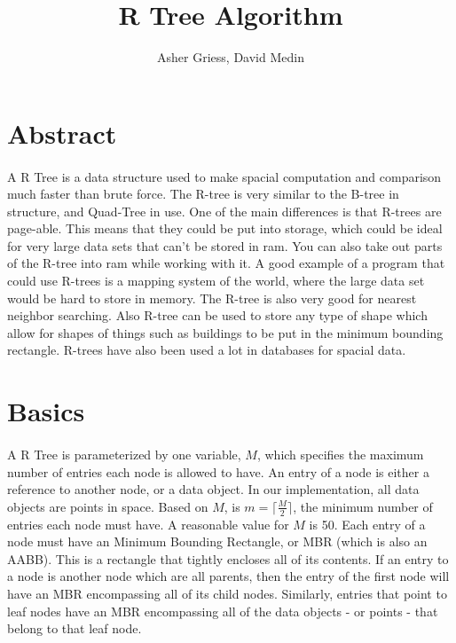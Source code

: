 \documentclass{article}
\author{Asher Griess, David Medin}
\title{R Tree Algorithm}
\begin{document}
\maketitle


\begin{multicols}{2}[]
\section{Abstract}
\paragraph{}
A R Tree is a data structure used to make spacial computation and comparison much faster than brute force.
The R-tree is very similar to the B-tree in structure, and Quad-Tree in use. One of the main differences is that
R-trees are page-able. This means that they could be put into storage, which could be ideal for very large data sets 
that can't be stored in ram.  You can also take out parts of the R-tree into ram while working with it. A good example
of a program that could use R-trees is a mapping system of the world, where the large data set would be hard to store in memory.
The R-tree is also very good for nearest neighbor searching. Also R-tree can be used to store any type of shape which allow for shapes
of things such as buildings to be put in the minimum bounding rectangle. R-trees have also been used a lot in databases for spacial data.

\section{Basics}

\paragraph{}
A R Tree is parameterized by one variable, $M$, which specifies the maximum number of entries each node is allowed to have. An entry of a node is either a reference
to another node, or a data object. In our implementation, all data objects are points in space.
Based on $M$, is $m = \lceil\frac{M}{2}\rceil$, the minimum number of entries each node must have. A reasonable value for $M$ is 50. \cite{guttman_1984_rtrees} Each entry of a node must have an Minimum Bounding Rectangle,
or MBR (which is also an AABB). This is a rectangle that tightly encloses all of its contents. If an entry to a node is another node which are all parents, then the entry
of the first node will have an MBR encompassing all of its child nodes. Similarly, entries that point to leaf nodes have an MBR encompassing all of the data objects - or points - that belong to that leaf node.


\end{multicols}
\end{document}
